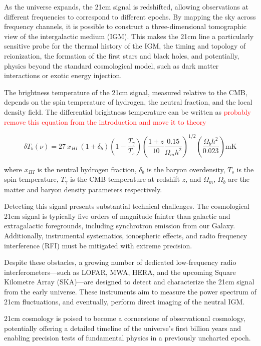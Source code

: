 \documentclass[floats,floatfix,showpacs,amssymb,prd,superscriptaddress,nofootinbib]{revtex4-2} %
\newcommand{\red}{\textcolor{red}}
\begin{document}
As the universe expands, the 21cm signal is redshifted, allowing observations at different frequencies to correspond to different epochs. By mapping the sky across frequency channels, it is possible to construct a three-dimensional tomographic view of the intergalactic medium (IGM). This makes the 21cm line a particularly sensitive probe for the thermal history of the IGM, the timing and topology of reionization, the formation of the first stars and black holes, and potentially, physics beyond the standard cosmological model, such as dark matter interactions or exotic energy injection.

The brightness temperature of the 21cm signal, measured relative to the CMB, depends on the spin temperature of hydrogen, the neutral fraction, and the local density field. The differential brightness temperature can be written as \red{probably remove this equation from the introduction and move it to theory}

\begin{equation}
    \delta T_b (\nu) = 27 \ x_{HI} \ (1 + \delta_b) \left(1 - \frac{T_\gamma}{T_s} \right) \left(\frac{1 + z}{10} \frac{0.15}{\Omega_m h^2} \right)^{1/2} \left( \frac{\Omega_b h^2}{0.023} \right) \text{mK}
\end{equation}

\noindent where $x_{HI}$ is the neutral hydrogen fraction, $\delta_b$ is the baryon overdensity, $T_s$ is the spin temperature, $T_\gamma$ is the CMB temperature at redshift $z$, and $\Omega_m$, $\Omega_b$ are the matter and baryon density parameters respectively.

Detecting this signal presents substantial technical challenges. The cosmological 21cm signal is typically five orders of magnitude fainter than galactic and extragalactic foregrounds, including synchrotron emission from our Galaxy. Additionally, instrumental systematics, ionospheric effects, and radio frequency interference (RFI) must be mitigated with extreme precision.

Despite these obstacles, a growing number of dedicated low-frequency radio interferometers—such as LOFAR, MWA, HERA, and the upcoming Square Kilometre Array (SKA)—are designed to detect and characterize the 21cm signal from the early universe. These instruments aim to measure the power spectrum of 21cm fluctuations, and eventually, perform direct imaging of the neutral IGM.

21cm cosmology is poised to become a cornerstone of observational cosmology, potentially offering a detailed timeline of the universe's first billion years and enabling precision tests of fundamental physics in a previously uncharted epoch.
\end{document}
